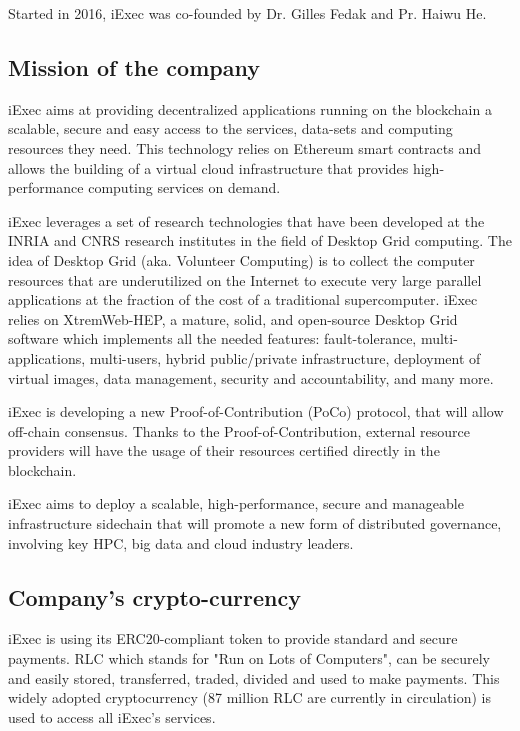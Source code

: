   Started in 2016, iExec\cite{iExec} was co-founded by Dr. Gilles Fedak and Pr. Haiwu He.
  
  \subsection{Mission of the company}
    iExec aims at providing decentralized applications running on the blockchain a scalable,
    secure and easy access to the services, data-sets and computing resources they need. This
    technology relies on Ethereum smart contracts and allows the building of a virtual cloud
    infrastructure that provides high-performance computing services on demand.

    iExec leverages a set of research technologies that have been developed at the INRIA and CNRS
    research institutes in the field of Desktop Grid computing. The idea of Desktop Grid
    (aka. Volunteer Computing) is to collect the computer resources that are underutilized on the
    Internet to execute very large parallel applications at the fraction of the cost of a
    traditional supercomputer. iExec relies on XtremWeb-HEP\cite{xtremweb}, a mature, solid, and open-source Desktop
    Grid software which implements all the needed features: fault-tolerance, multi-applications,
    multi-users, hybrid public/private infrastructure, deployment of virtual images, data management,
    security and accountability, and many more.

    iExec is developing a new Proof-of-Contribution\cite{POCO} (PoCo) protocol, that will allow off-chain
    consensus. Thanks to the Proof-of-Contribution, external resource providers will have the usage
    of their resources certified directly in the blockchain.

    iExec aims to deploy a scalable, high-performance, secure and manageable infrastructure sidechain
    that will promote a new form of distributed governance, involving key HPC, big data and cloud
    industry leaders.

  \subsection{Company's crypto-currency}
    iExec is using its ERC20-compliant token to provide standard and secure payments. RLC\cite{RLC} which stands for
    "Run on Lots of Computers", can be securely and easily stored, transferred, traded, divided and used
    to make payments. This widely adopted cryptocurrency (87 million RLC are currently in circulation)
    is used to access all iExec's services.

